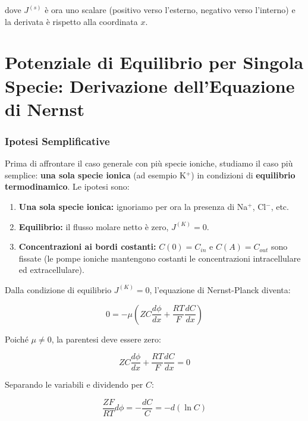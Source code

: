 dove $J^{(s)}$ è ora uno scalare (positivo verso l'esterno, negativo verso l'interno) e la derivata è rispetto alla coordinata $x$.



\section{Potenziale di Equilibrio per Singola Specie: Derivazione dell'Equazione di Nernst}

\subsubsection{Ipotesi Semplificative}

Prima di affrontare il caso generale con più specie ioniche, studiamo il caso più semplice: \textbf{una sola specie ionica} (ad esempio K$^+$) in condizioni di \textbf{equilibrio termodinamico}. Le ipotesi sono:

\begin{enumerate}
    \item \textbf{Una sola specie ionica:} ignoriamo per ora la presenza di Na$^+$, Cl$^-$, etc.
    \item \textbf{Equilibrio:} il flusso molare netto è zero, $J^{(K)} = 0$.
    \item \textbf{Concentrazioni ai bordi costanti:} $C(0) = C_{in}$ e $C(A) = C_{out}$ sono fissate (le pompe ioniche mantengono costanti le concentrazioni intracellulare ed extracellulare).
\end{enumerate}



Dalla condizione di equilibrio $J^{(K)} = 0$, l'equazione di Nernst-Planck diventa:

\begin{equation}
0 = -\mu \left( Z C \frac{d\phi}{dx} + \frac{RT}{F} \frac{dC}{dx} \right)
\end{equation}

Poiché $\mu \neq 0$, la parentesi deve essere zero:

\begin{equation}
Z C \frac{d\phi}{dx} + \frac{RT}{F} \frac{dC}{dx} = 0
\end{equation}

Separando le variabili e dividendo per $C$:

\begin{equation}
\frac{ZF}{RT} d\phi = -\frac{dC}{C} = -d(\ln C)
\end{equation}



